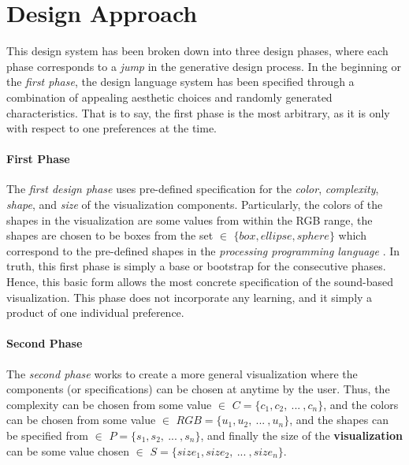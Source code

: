 \documentclass{evolang12}
\begin{document}

\section{Design Approach}
This design system has been broken down into three design phases, where each phase corresponds to a \textit{jump} in the generative design process. In the beginning or the \textit{first phase}, the design language system has been specified through a combination of appealing aesthetic choices and randomly generated characteristics. That is to say, the first phase is the most arbitrary, as it is only with respect to one preferences at the time.

\paragraph{First Phase}
The \textit{first design phase} uses pre-defined specification for the \textit{color}, \textit{complexity}, \textit{shape}, and \textit{size} of the visualization components. Particularly, the colors of the shapes in the visualization are some values from within the RGB range, the shapes are chosen to be boxes  from the set $\in$ $\lbrace box, ellipse, sphere \rbrace$ which correspond to the pre-defined shapes in the \textit{processing programming language} \cite{reas2006processing}. In truth, this first phase is simply a base or bootstrap for the consecutive phases. Hence, this basic form allows the most concrete specification of the sound-based visualization. This phase does not incorporate any learning, and it simply a product of one individual preference.

\paragraph{Second Phase}
The \textit{second phase} works to create a more general visualization where the components (or specifications) can be chosen at anytime by the user. Thus, the complexity can be chosen from some value $\in$ $ C = \lbrace c_1, c_2, \ ... \ , c_n \rbrace$, and the colors can be chosen from some value $\in$ $RGB = \lbrace u_1, u_2, \ ... \ , u_n \rbrace$, and the shapes can be specified from $\in$ 
$P = \lbrace s_1, s_2, \ ... \ , s_n \rbrace$, and finally the size of the \textbf{visualization} can be some value chosen $\in$ $ S = \lbrace size_1, size_2, \ ... \ , size_n \rbrace$. 
\end{document}
